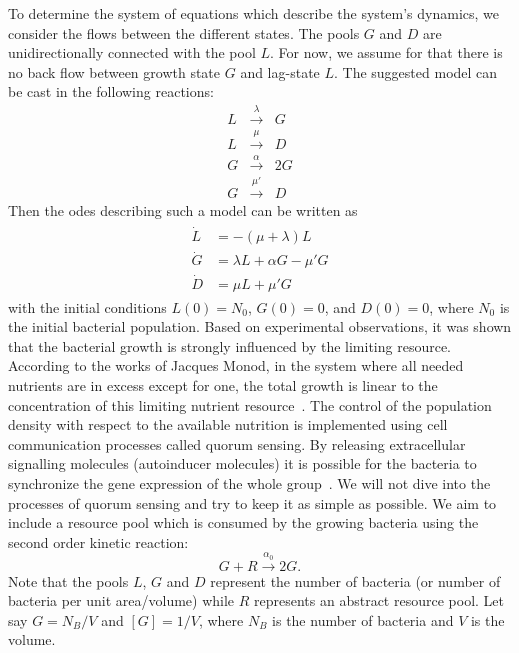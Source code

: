 \documentclass[10pt,twocolumn,5p]{elsarticle}
\numberwithin{equation}{section}
\begin{document}
To determine the system of equations which describe the system's dynamics, we consider the flows between the different states.
The pools $G$ and $D$ are unidirectionally connected with the pool $L$.
For now, we assume for that there is no back flow between growth state $G$ and lag-state $L$.
The suggested model can be cast in the following reactions:
\begin{eqnarray}
    L &\stackrel{\lambda}{\longrightarrow} & G\\
    L &\stackrel{\mu}{\longrightarrow} & D\\
    G &\stackrel{\alpha}{\longrightarrow} & 2G\\
    G &\stackrel{\mu'}{\longrightarrow} & D
 \end{eqnarray}
Then the \acp{ode} describing such a model can be written as
\begin{align}\begin{split}
    \dot{L} &= -(\mu + \lambda) L\\
    \dot{G} &= \lambda L + \alpha G - \mu' G\\
    \dot{D} &= \mu  L + \mu' G 
\end{split}\end{align}
with the initial conditions $L(0)=N_0$, $G(0)=0$, and $D(0)=0$, where $N_0$ is the initial bacterial population.
%
Based on experimental observations, it was shown that the bacterial growth is strongly influenced by the limiting resource.
According to the works of Jacques Monod, in the system where all needed nutrients are in excess except for one, the total growth is linear to the concentration of this limiting nutrient resource~\cite{monod_growth_1949}.
The control of the population density with respect to the available nutrition is implemented using cell communication processes called quorum sensing.
By releasing extracellular signalling molecules (autoinducer molecules) it is possible for the bacteria to synchronize the gene expression of the whole group~\cite{ng_bacterial_2009}.
We will not dive into the processes of quorum sensing and try to keep it as simple as possible.
We aim to include a resource pool which is consumed by the growing bacteria using the second order kinetic reaction:
\begin{equation}
    G + R  \stackrel{\alpha_0}{\longrightarrow} 2G.
\end{equation}
Note that the pools $L$, $G$ and $D$ represent the number of bacteria (or number of bacteria per unit area/volume) while $R$ represents an abstract resource pool.
Let say $G=N_B/V$ and $[G]=1/V$, where $N_B$ is the number of bacteria and $V$ is the volume.
\end{document}
